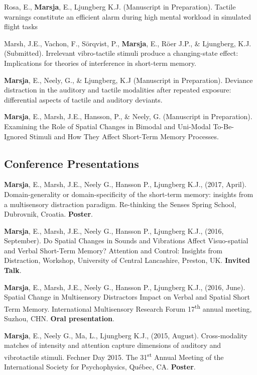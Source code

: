 \documentclass[]{article}
\begin{document}
Rosa, E., \textbf{Marsja}, E., Ljungberg K.J. (Manuscript in
Preparation). Tactile warnings constitute an efficient alarm during high
mental workload in simulated flight tasks

Marsh, J.E., Vachon, F., Sörqvist, P., \textbf{Marsja}, E., Röer J.P.,
\& Ljungberg, K.J. (Submitted). Irrelevant vibro-tactile stimuli produce
a changing-state effect: Implications for theories of interference in
short-term memory.

\textbf{Marsja}, E., Neely, G., \& Ljungberg, K.J (Manuscript in
Preparation). Deviance distraction in the auditory and tactile
modalities after repeated exposure: differential aspects of tactile and
auditory deviants.

\textbf{Marsja}, E., Marsh, J.E., Hansson, P., \& Neely, G. (Manuscript
in Preparation). Examining the Role of Spatial Changes in Bimodal and
Uni-Modal To-Be-Ignored Stimuli and How They Affect Short-Term Memory
Processes.

\subsection{Conference Presentations}\label{conference-presentations}

\textbf{Marsja}, E., Marsh, J.E., Neely G., Hansson P., Ljungberg K.J.,
(2017, April). Domain-generality or domain-specificity of the short-term
memory: insights from a multisensory distraction paradigm. Re-thinking
the Senses Spring School, Dubrovnik, Croatia. \textbf{Poster}.

\textbf{Marsja}, E., Marsh, J.E., Neely G., Hansson P., Ljungberg K.J.,
(2016, September). Do Spatial Changes in Sounds and Vibrations Affect
Visuo-spatial and Verbal Short-Term Memory? Attention and Control:
Insights from Distraction, Workshop, University of Central Lancashire,
Preston, UK. \textbf{Invited Talk}.

\textbf{Marsja}, E., Marsh, J.E., Neely G., Hansson P., Ljungberg K.J.,
(2016, June). Spatial Change in Multisensory Distractors Impact on
Verbal and Spatial Short Term Memory. International Multisensory
Research Forum 17\textsuperscript{th} annual meeting, Suzhou, CHN.
\textbf{Oral presentation}.

\textbf{Marsja}, E., Neely G., Ma, L., Ljungberg K.J., (2015, August).
Cross-modality matches of intensity and attention capture dimensions of
auditory and vibrotactile stimuli. Fechner Day 2015. The
31\textsuperscript{st} Annual Meeting of the International Society for
Psychophysics, Québec, CA. \textbf{Poster}.
\end{document}
